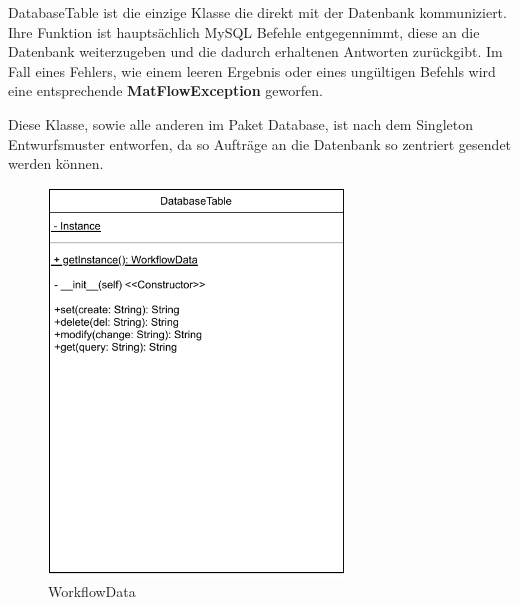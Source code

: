 DatabaseTable ist die einzige Klasse die direkt mit der Datenbank kommuniziert. Ihre Funktion ist hauptsächlich MySQL Befehle entgegennimmt, diese an die Datenbank weiterzugeben und die dadurch erhaltenen Antworten zurückgibt. Im Fall eines Fehlers, wie einem leeren Ergebnis oder eines ungültigen Befehls wird eine entsprechende \textbf{MatFlowException} geworfen.

Diese Klasse, sowie alle anderen im Paket Database, ist nach dem Singleton Entwurfsmuster entworfen, da so Aufträge an die Datenbank so zentriert gesendet werden können.
\begin{figure}[h]
	\centering
	\includegraphics[width=0.7\textwidth]{res/Klassen/DatabaseTable.pdf} 
	\caption{WorkflowData}
	\label{fig:workflowDataClass}
\end{figure}

